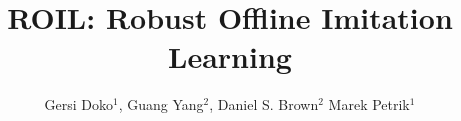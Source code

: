 \documentclass[final,a0paper]{beamer}
\title{ROIL\@: Robust Offline Imitation Learning}
\author[]{Gersi Doko$^{1}$, Guang Yang$^{2}$, Daniel S. Brown$^{2}$ Marek Petrik$^{1}$}
\institute{$^{1}$University of New Hampshire, $^{2}$University of Utah}
\begin{document}
\begin{frame}{}
\vspace{-2cm}
\begin{columns}[t]
  \begin{column}{0.3\linewidth}
    
    
  \end{column}
  
  \begin{column}{0.3\linewidth}
    
    
  \end{column}

  \begin{column}{0.3\linewidth}
    
  \end{column}
\end{columns}
\end{frame}
\end{document}
